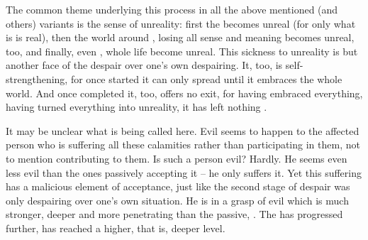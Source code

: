 \label{pa:unreality} 
The common theme underlying this process in all the above mentioned (and others)
variants is the sense of unreality: first the  becomes unreal (for
only what is  is real), then the world around , losing all
sense and meaning becomes unreal, too, and finally, even , 
whole {life} become unreal. This sickness to unreality is but another face of
the despair over one's own despairing. %
It, too, is self-strengthening, for once started it can only spread until it
embraces the whole world. And once completed it, too, offers no exit, for having
embraced everything, having turned everything into unreality, it has left
nothing .


\pa\label{whoisevil} It may be unclear what is being called  here. Evil
seems to happen to the affected person who is suffering all these calamities
rather than participating in them, not to mention contributing to them. Is such
a person evil? Hardly. He seems even less evil than the ones
passively accepting it -- he only suffers it. Yet this suffering has a malicious
element of acceptance, just like the second stage of despair was only despairing
over one's own situation. He is in a grasp of evil which is much stronger,
deeper and more penetrating than the passive, .  The
 has progressed further, has reached a higher, that
is, deeper level.

